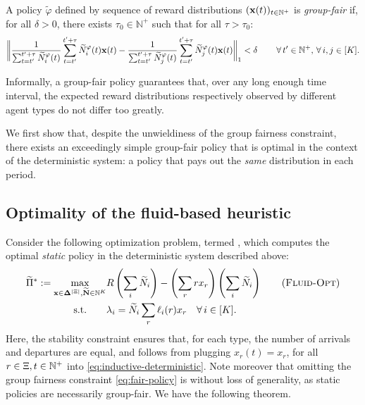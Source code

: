 \documentclass[12pt]{article}
\begin{document}
\begin{definition}\label{def:fair_policy}
A policy $\widetilde{\varphi}$ defined by sequence of reward distributions $(\mathbf{x}(t))_{t \in \mathbb{N}^+}$ is \emph{group-fair} if, for all $\delta > 0$, there exists $\tau_0 \in \mathbb{N}^+$ such that for all $\tau > \tau_0$:
\begin{align}\label{eq:fair-policy}
    \bigg{\lVert}\frac{1}{\sum_{t=t'}^{t'+\tau}\widetilde{N}^\varphi_i(t)}\sum_{t=t'}^{t'+\tau} \widetilde{N}^\varphi_i(t)\mathbf{x}(t) - \frac{1}{\sum_{t=t'}^{t'+\tau}\widetilde{N}^\varphi_j(t)}\sum_{t=t'}^{t'+\tau} \widetilde{N}^\varphi_j(t)\mathbf{x}(t) \bigg{\rVert}_1 < \delta  \qquad \, \forall \, t' \in \mathbb{N}^+, \, \forall \, i,j \in [K]. 
\end{align}

\end{definition}
Informally, a group-fair policy guarantees that, over any long enough time interval, the expected reward distributions respectively observed by different agent types do not differ too greatly.

We first show that, despite the unwieldiness of the group fairness constraint, there exists an exceedingly simple group-fair policy that is optimal in the context of the deterministic system: a policy that pays out the {\it same} distribution in each period.


\subsection{Optimality of the fluid-based heuristic}

 Consider the following optimization problem, termed \fluidopt, which computes the optimal {\it static} policy in the deterministic system described above:
\begin{align}\label{eq:fluid-opt}
    \optfluidprofit := \max_{\xvec \in \simplex^{|\rewardset|}, {\mathbf{\fluidn} \in \mathbb{N}^K}} &\rev\left(\sum_i \fluidn_i\right) - \left(\sum_r r x_r\right)\left(\sum_i \fluidn_i\right)\tag{\fluidopt}\\
    \text{s.t.} \qquad &\lambda_i=\fluidn_i\sum_r\ell_i(r)x_r \quad \forall \, i \in [K]. \notag 
\end{align}
Here, the stability constraint ensures that, for each type, the number of arrivals and departures are equal, and follows from plugging $x_r(t) = x_r$, for all $r \in \Xi, t \in \mathbb{N}^+$ into \eqref{eq:inductive-deterministic}.  Note moreover that omitting the group fairness constraint \eqref{eq:fair-policy} is without loss of generality, as static policies are necessarily group-fair. We have the following theorem.
\end{document}
